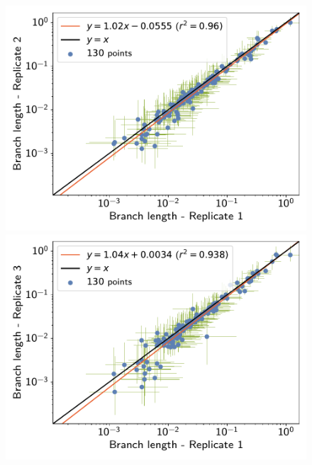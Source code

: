 \documentclass{article}
\begin{document}
	\begin{figure}[H]
		\centering
		\begin{minipage}{0.32\linewidth}
			\includegraphics[width=\linewidth, page=1]{isopods/12CDS_SiteMutSelBranchNe_Rep-1-2_Log10BranchLength}
		\end{minipage} \hfill
		\begin{minipage}{0.32\linewidth}
			\includegraphics[width=\linewidth, page=1]{isopods/12CDS_SiteMutSelBranchNe_Rep-1-3_Log10BranchLength}
		\end{minipage} \hfill
		\begin{minipage}{0.32\linewidth}

\end{minipage}
\end{figure}
\end{document}

